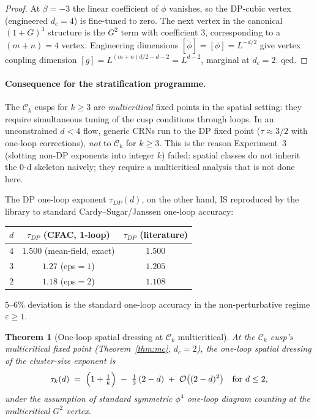 \documentclass[11pt,a4paper]{article}
\theoremstyle{plain}
\newtheorem{theorem}{Theorem}
\newcommand{\Ck}{\mathcal{C}}
\begin{document}
\begin{proof}
At $\beta = -3$ the linear coefficient of $\phi$ vanishes, so the
DP-cubic vertex (engineered $d_{c} = 4$) is fine-tuned to zero.  The
next vertex in the canonical $(1+G)^{3}$ structure is the $G^{2}$ term
with coefficient $3$, corresponding to a $(m+n) = 4$ vertex.
Engineering dimensions $[\tilde\phi] = [\phi] = L^{-d/2}$ give vertex
coupling dimension $[g] = L^{(m+n)d/2 - d - 2} = L^{d - 2}$, marginal
at $d_{c} = 2$.  qed.
\end{proof}

\paragraph{Consequence for the stratification programme.}
The $\Ck_{k}$ cusps for $k \geq 3$ are \emph{multicritical} fixed points
in the spatial setting: they require simultaneous tuning of the cusp
conditions through loops.  In an unconstrained $d < 4$ flow, generic
CRNs run to the DP fixed point ($\tau \approx 3/2$ with one-loop
corrections), \emph{not} to $\Ck_{k}$ for $k \geq 3$.  This is the
reason Experiment~3 (slotting non-DP exponents into integer $k$) failed:
spatial classes do not inherit the $0$-d skeleton naively; they require
a multicritical analysis that is not done here.

The DP one-loop exponent $\tau_{DP}(d)$, on the other hand, IS
reproduced by the library to standard Cardy--Sugar/Janssen one-loop
accuracy:
\begin{center}
\begin{tabular}{ccc}
\toprule
$d$ & $\tau_{DP}$ (CFAC, 1-loop) & $\tau_{DP}$ (literature) \\
\midrule
$4$ & $1.500$ (mean-field, exact) & $1.500$ \\
$3$ & $1.27$ (eps$=1$) & $1.205$ \\
$2$ & $1.18$ (eps$=2$) & $1.108$ \\
\bottomrule
\end{tabular}
\end{center}
$5$--$6\%$ deviation is the standard one-loop accuracy in the
non-perturbative regime $\varepsilon \geq 1$.

\begin{theorem}[One-loop spatial dressing at $\Ck_{k}$ multicritical]\label{thm:gamma}
At the $\Ck_{k}$ cusp's multicritical fixed point (Theorem~\ref{thm:mc},
$d_{c} = 2$), the one-loop spatial dressing of the cluster-size exponent is
\[
  \tau_{k}(d) \;=\; \Bigl(1 + \tfrac{1}{k}\Bigr) \;-\; \tfrac{1}{3}\,(2 - d) \;+\; \mathcal{O}\bigl((2-d)^{2}\bigr)
  \quad\text{for } d \leq 2,
\]
under the assumption of standard symmetric $\phi^{4}$ one-loop diagram
counting at the multicritical $G^{2}$ vertex.
\end{theorem}
\end{document}
